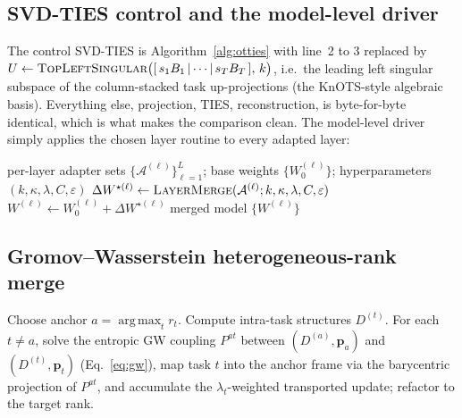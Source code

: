 \documentclass[11pt]{article}
\newcommand{\dW}{\Delta W}
\newcommand{\argmax}{\operatorname*{arg\,max}}
\newcommand{\otties}{\textsc{OT-TIES}}
\newcommand{\svdties}{\textsc{SVD-TIES}}
\begin{document}
\subsection{SVD-TIES control and the model-level driver}
The control \svdties{} is Algorithm~\ref{alg:otties} with line~2 to 3 replaced by
$U\gets\textsc{TopLeftSingular}\big([\,s_1B_1\,|\cdots|\,s_TB_T\,],\,k\big)$, i.e.\ the leading left
singular subspace of the column-stacked task up-projections (the KnOTS-style algebraic basis). Everything
else, projection, TIES, reconstruction, is byte-for-byte identical, which is what makes the
comparison clean. The model-level driver simply applies the chosen layer routine to every adapted layer:
\begin{algorithm}[H]
\caption{Model-level merge (\otties{} or \svdties{})}
\begin{algorithmic}[1]
\Require per-layer adapter sets $\{\mathcal A^{(\ell)}\}_{\ell=1}^L$; base weights $\{W_0^{(\ell)}\}$;
hyperparameters $(k,\kappa,\lambda,C,\varepsilon)$
  \State $\dW^{\star(\ell)} \gets \textsc{LayerMerge}(\mathcal A^{(\ell)}; k,\kappa,\lambda,C,\varepsilon)$
  \State $W^{(\ell)} \gets W_0^{(\ell)} + \dW^{\star(\ell)}$
\EndFor
\State \Return merged model $\{W^{(\ell)}\}$
\end{algorithmic}
\end{algorithm}

\subsection{Gromov--Wasserstein heterogeneous-rank merge}
Choose anchor $a=\argmax_t r_t$. Compute intra-task structures $D^{(t)}$. For each $t\neq a$, solve the
entropic GW coupling $P^{at}$ between $(D^{(a)},\bm p_a)$ and $(D^{(t)},\bm p_t)$
(Eq.~\eqref{eq:gw}), map task $t$ into the anchor frame via the barycentric projection of $P^{at}$, and
accumulate the $\lambda_t$-weighted transported update; refactor to the target rank.
\end{document}
